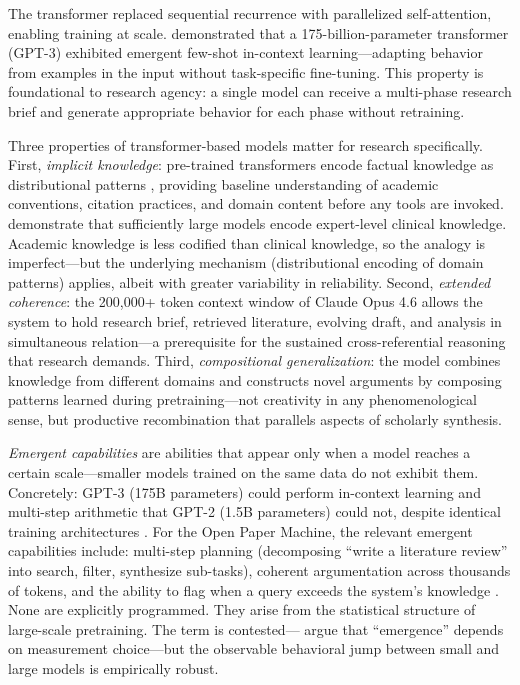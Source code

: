 \documentclass{article}
\begin{document}
The transformer \citep{vaswani2017attention} replaced sequential recurrence with parallelized self-attention, enabling training at scale. \citet{brown2020gpt3} demonstrated that a 175-billion-parameter transformer (GPT-3) exhibited emergent few-shot in-context learning---adapting behavior from examples in the input without task-specific fine-tuning. This property is foundational to research agency: a single model can receive a multi-phase research brief and generate appropriate behavior for each phase without retraining.

Three properties of transformer-based models matter for research specifically. First, \textit{implicit knowledge}: pre-trained transformers encode factual knowledge as distributional patterns \citep{petroni2019language}, providing baseline understanding of academic conventions, citation practices, and domain content before any tools are invoked. \citet{singhal2023medpalm} demonstrate that sufficiently large models encode expert-level clinical knowledge. Academic knowledge is less codified than clinical knowledge, so the analogy is imperfect---but the underlying mechanism (distributional encoding of domain patterns) applies, albeit with greater variability in reliability. Second, \textit{extended coherence}: the 200,000+ token context window of Claude Opus 4.6 allows the system to hold research brief, retrieved literature, evolving draft, and analysis in simultaneous relation---a prerequisite for the sustained cross-referential reasoning that research demands. Third, \textit{compositional generalization}: the model combines knowledge from different domains and constructs novel arguments by composing patterns learned during pretraining---not creativity in any phenomenological sense, but productive recombination that parallels aspects of scholarly synthesis.

\textit{Emergent capabilities} are abilities that appear only when a model reaches a certain scale---smaller models trained on the same data do not exhibit them. Concretely: GPT-3 (175B parameters) could perform in-context learning and multi-step arithmetic that GPT-2 (1.5B parameters) could not, despite identical training architectures \citep{brown2020gpt3}. For the Open Paper Machine, the relevant emergent capabilities include: multi-step planning (decomposing ``write a literature review'' into search, filter, synthesize sub-tasks), coherent argumentation across thousands of tokens, and the ability to flag when a query exceeds the system's knowledge \citep{kalyan2024gpt3}. None are explicitly programmed. They arise from the statistical structure of large-scale pretraining. The term is contested---\citet{schaeffer2024emergent} argue that ``emergence'' depends on measurement choice---but the observable behavioral jump between small and large models is empirically robust.
\end{document}
